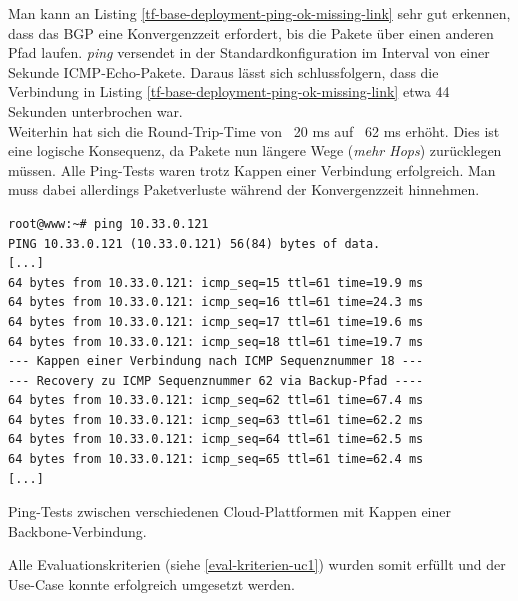 Man kann an Listing \ref{tf-base-deployment-ping-ok-missing-link} sehr gut erkennen, dass das BGP eine Konvergenzzeit erfordert, bis die Pakete über einen anderen Pfad laufen. \textit{ping} versendet in der Standardkonfiguration im Interval von einer Sekunde ICMP-Echo-Pakete. Daraus lässt sich schlussfolgern, dass die Verbindung in Listing \ref{tf-base-deployment-ping-ok-missing-link} etwa 44 Sekunden unterbrochen war.\\
Weiterhin hat sich die Round-Trip-Time von ~20 ms auf ~62 ms erhöht. Dies ist eine logische Konsequenz, da Pakete nun längere Wege (\textit{mehr Hops}) zurücklegen müssen. Alle Ping-Tests waren trotz Kappen einer Verbindung erfolgreich. Man muss dabei allerdings Paketverluste während der Konvergenzzeit hinnehmen.
\begin{listing}[h]
\begin{verbatim}
root@www:~# ping 10.33.0.121
PING 10.33.0.121 (10.33.0.121) 56(84) bytes of data.
[...]
64 bytes from 10.33.0.121: icmp_seq=15 ttl=61 time=19.9 ms
64 bytes from 10.33.0.121: icmp_seq=16 ttl=61 time=24.3 ms
64 bytes from 10.33.0.121: icmp_seq=17 ttl=61 time=19.6 ms
64 bytes from 10.33.0.121: icmp_seq=18 ttl=61 time=19.7 ms 
--- Kappen einer Verbindung nach ICMP Sequenznummer 18 ---
--- Recovery zu ICMP Sequenznummer 62 via Backup-Pfad ----
64 bytes from 10.33.0.121: icmp_seq=62 ttl=61 time=67.4 ms
64 bytes from 10.33.0.121: icmp_seq=63 ttl=61 time=62.2 ms
64 bytes from 10.33.0.121: icmp_seq=64 ttl=61 time=62.5 ms
64 bytes from 10.33.0.121: icmp_seq=65 ttl=61 time=62.4 ms
[...]
\end{verbatim}
\caption{Ping-Tests zwischen verschiedenen Cloud-Plattformen mit Kappen einer Backbone-Verbindung.}
\label{tf-base-deployment-ping-ok-missing-link}
\end{listing}\FloatBarrier
Alle Evaluationskriterien (siehe \ref{eval-kriterien-uc1}) wurden somit erfüllt und der Use-Case konnte erfolgreich umgesetzt werden.
